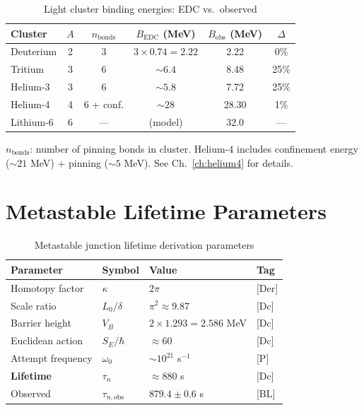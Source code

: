 \begin{table}[htbp]
\centering
\caption{Light cluster binding energies: EDC vs.\ observed}
\label{tab:light_binding}
\begin{tabular}{lccccc}
    \toprule
    Cluster & $A$ & $n_{\text{bonds}}$ & $B_{\text{EDC}}$ (MeV) & $B_{\text{obs}}$ (MeV) & $\Delta$ \\
    \midrule
    Deuterium & 2 & 3 & $3 \times 0.74 = 2.22$ & 2.22 & 0\% \\
    Tritium & 3 & 6 & $\sim 6.4$ & 8.48 & 25\% \\
    Helium-3 & 3 & 6 & $\sim 5.8$ & 7.72 & 25\% \\
    Helium-4 & 4 & 6 + conf. & $\sim 28$ & 28.30 & 1\% \\
    Lithium-6 & 6 & --- & (model) & 32.0 & --- \\
    \bottomrule
\end{tabular}

\vspace{2mm}
\footnotesize
$n_{\text{bonds}}$: number of pinning bonds in cluster.
Helium-4 includes confinement energy ($\sim 21$ MeV) + pinning ($\sim 5$ MeV).
See Ch.~\ref{ch:helium4} for details.
\end{table}

\section{Metastable Lifetime Parameters}
\label{sec:tables:metastable}

\begin{table}[htbp]
\centering
\caption{Metastable junction lifetime derivation parameters}
\label{tab:metastable_params}
\begin{tabular}{llll}
    \toprule
    Parameter & Symbol & Value & Tag \\
    \midrule
    Homotopy factor & $\kappa$ & $2\pi$ & [Der] \\
    Scale ratio & $L_0/\delta$ & $\pi^2 \approx 9.87$ & [Dc] \\
    Barrier height & $V_B$ & $2 \times 1.293 = 2.586$ MeV & [Dc] \\
    Euclidean action & $S_E/\hbar$ & $\approx 60$ & [Dc] \\
    Attempt frequency & $\omega_0$ & $\sim 10^{21}$ s$^{-1}$ & [P] \\
    \midrule
    \textbf{Lifetime} & $\tau_n$ & $\approx 880$ s & [Dc] \\
    Observed & $\tau_{n,\text{obs}}$ & $879.4 \pm 0.6$ s & [BL] \\
    \bottomrule
\end{tabular}
\end{table}


